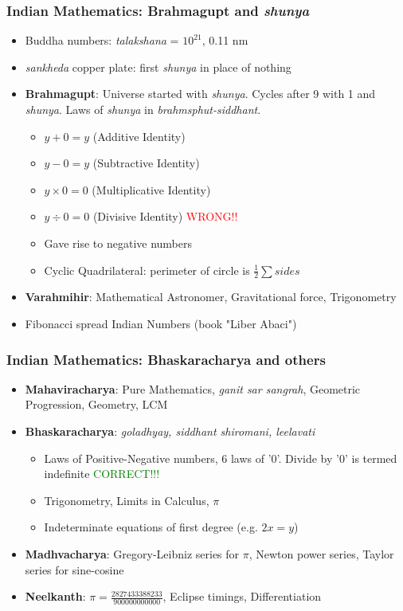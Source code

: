\begin{frame}[fragile]
\frametitle{Indian Mathematics: Brahmagupt and {\it shunya}}
\begin{itemize}[label=\textbullet,noitemsep,nolistsep]
\item Buddha numbers: {\it talakshana} = $10^{21}$, 0.11 nm
\item {\it sankheda} copper plate: first {\it shunya} in place of nothing
\item \textbf{Brahmagupt}: Universe started with {\it shunya}. Cycles after 9 with 1 and {\it shunya}. Laws of {\it shunya} in {\it brahmsphut-siddhant}. 
	\begin{itemize}[label=\textbullet, noitemsep,nolistsep]
	\item $y + 0 = y$ (Additive Identity)
	\item $y - 0 = y$ (Subtractive Identity)
	\item $y \times 0 = 0$ (Multiplicative Identity)	
	\item $y \div 0 = 0$ (Divisive Identity) \textcolor{red}{WRONG!!}
	\item Gave rise to negative numbers
	\item Cyclic Quadrilateral: perimeter of circle is $\frac{1}{2}\sum{sides}$
	\end{itemize}
\item \textbf{Varahmihir}: Mathematical Astronomer, Gravitational force, Trigonometry
\item Fibonacci spread Indian Numbers (book "Liber Abaci")
\end{itemize}
\end{frame}

\begin{frame}[fragile]
\frametitle{Indian Mathematics: Bhaskaracharya and others}
\begin{itemize}[label=\textbullet,noitemsep,nolistsep]
\item \textbf{Mahaviracharya}: Pure Mathematics, {\it ganit sar sangrah}, Geometric Progression, Geometry, LCM
\item \textbf{Bhaskaracharya}: {\it goladhyay, siddhant shiromani, leelavati}
	\begin{itemize}[label=\textbullet, noitemsep,nolistsep]
	\item Laws of Positive-Negative numbers, 6 laws of '0'. Divide by '0' is termed indefinite \textcolor{green}{CORRECT!!!}
	\item Trigonometry, Limits in Calculus, $\pi$
	\item Indeterminate equations of first degree (e.g. $2x = y$)
	\end{itemize}
\item \textbf{Madhvacharya}: Gregory-Leibniz series for $\pi$, Newton power series, Taylor series for sine-cosine
\item \textbf{Neelkanth}: $\pi = \frac{2827433388233}{900000000000}$, Eclipse timings, Differentiation
\end{itemize}
\end{frame}

